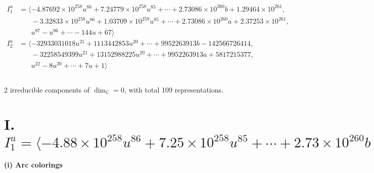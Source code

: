 \documentclass[1p]{elsarticle_modified}
\theoremstyle{definition}
\begin{document}
\begin{align*}
I^u_{1}&=\langle 
-4.87692\times10^{258} u^{86}+7.24779\times10^{258} u^{85}+\cdots+2.73086\times10^{260} b+1.29464\times10^{261},\\
\phantom{I^u_{1}}&\phantom{= \langle  }-3.32833\times10^{258} u^{86}+1.03709\times10^{259} u^{85}+\cdots+2.73086\times10^{260} a+2.37253\times10^{261},\\
\phantom{I^u_{1}}&\phantom{= \langle  }u^{87}- u^{86}+\cdots-144 u+67\rangle \\
I^u_{2}&=\langle 
-32933031018 u^{21}+1113442853 u^{20}+\cdots+9952263913 b-142566726414,\\
\phantom{I^u_{2}}&\phantom{= \langle  }-32258549399 u^{21}+13152988225 u^{20}+\cdots+9952263913 a+5817215377,\\
\phantom{I^u_{2}}&\phantom{= \langle  }u^{22}-8 u^{20}+\cdots+7 u+1\rangle \\
\\
\end{align*}
\raggedright * 2 irreducible components of $\dim_{\mathbb{C}}=0$, with total 109 representations.\\
\newpage
\renewcommand{\arraystretch}{1}
\centering \section*{I. $I^u_{1}= \langle -4.88\times10^{258} u^{86}+7.25\times10^{258} u^{85}+\cdots+2.73\times10^{260} b+1.29\times10^{261},\;-3.33\times10^{258} u^{86}+1.04\times10^{259} u^{85}+\cdots+2.73\times10^{260} a+2.37\times10^{261},\;u^{87}- u^{86}+\cdots-144 u+67 \rangle$}
\flushleft \textbf{(i) Arc colorings}\\
\end{document}
